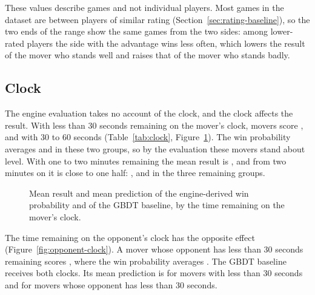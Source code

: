 \documentclass[11pt]{article}
\begin{document}
These values describe games and not individual players. Most games in the
dataset are between players of similar rating
(Section~\ref{sec:rating-baseline}), so the two ends of the range show the
same games from the two sides: among lower-rated players the side with the
advantage wins less often, which lowers the result of the mover who stands
well and raises that of the mover who stands badly.

\subsection{Clock}

The engine evaluation takes no account of the clock, and the clock affects
the result. With less than 30 seconds remaining on the mover's clock, movers
score , and with 30 to 60 seconds
 (Table~\ref{tab:clock},
Figure~\ref{fig:clock}). The win probability averages
 and
 in these two groups, so by the
evaluation these movers stand about level. With one to two minutes remaining
the mean result is , and from two minutes on
it is close to one half: ,
 and  in the
three remaining groups.

\begin{table}[htbp]\centering\footnotesize
{}
\caption{Test-set results by the time remaining on the mover's clock, in
seconds. \emph{Baseline's lead} is the difference between the two RMSE
values, without a confidence interval.}
\label{tab:clock}
\end{table}

\begin{figure}[htbp]\centering
{}
\caption{Mean result and mean prediction of the engine-derived win
probability and of the GBDT baseline, by the time remaining on the mover's
clock.}
\label{fig:clock}
\end{figure}

The time remaining on the opponent's clock has the opposite effect
(Figure~\ref{fig:opponent-clock}). A mover whose opponent has less than 30
seconds remaining scores , where the win
probability averages . The GBDT
baseline receives both clocks. Its mean prediction is
 for movers with less than 30 seconds and
 for movers whose opponent has
less than 30 seconds.
\end{document}
